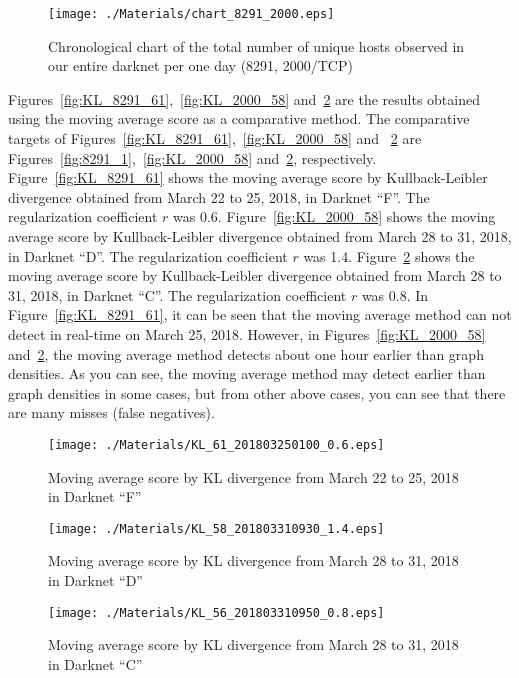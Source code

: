 \documentclass[letterpaper]{sig-alternate-10pt}
\begin{document}
\begin{figure}[htb]
\begin{center}
	\texttt{[image: ./Materials/chart\_8291\_2000.eps]}
	\caption{Chronological chart of the total number of unique hosts observed in our entire darknet per one day (8291, 2000/TCP)}
  	\label{fig:chart_8291_2000}
\end{center}
\end{figure}

Figures~\ref{fig:KL_8291_61},~\ref{fig:KL_2000_58} and~\ref{fig:KL_2000_56} are the results obtained using the moving average score as a comparative method.
The comparative targets of Figures~\ref{fig:KL_8291_61},~\ref{fig:KL_2000_58} and ~\ref{fig:KL_2000_56} are Figures~\ref{fig:8291_1},~\ref{fig:KL_2000_58} and~\ref{fig:KL_2000_56}, respectively.
Figure~\ref{fig:KL_8291_61} shows the moving average score by Kullback-Leibler divergence obtained from March 22 to 25, 2018, in Darknet ``F''.
The regularization coefficient $r$ was 0.6.
Figure~\ref{fig:KL_2000_58} shows the moving average score by Kullback-Leibler divergence obtained from March 28 to 31, 2018, in Darknet ``D''.
The regularization coefficient $r$ was 1.4.
Figure~\ref{fig:KL_2000_56} shows the moving average score by Kullback-Leibler divergence obtained from March 28 to 31, 2018, in Darknet ``C''.
The regularization coefficient $r$ was 0.8.
In Figure~\ref{fig:KL_8291_61}, it can be seen that the moving average method can not detect in real-time on March 25, 2018.
However, in Figures~\ref{fig:KL_2000_58} and~\ref{fig:KL_2000_56}, the moving average method detects about one hour earlier than graph densities.
As you can see, the moving average method may detect earlier than graph densities in some cases, but from other above cases, you can see that there are many misses (false negatives).

\begin{figure}[htb]
\begin{center}
	\texttt{[image: ./Materials/KL\_61\_201803250100\_0.6.eps]}
	\caption{Moving average score by KL divergence from March 22 to 25, 2018 in Darknet ``F''}
  	\label{fig:KL_8291_61}
	\vspace*{0.5cm}
	\texttt{[image: ./Materials/KL\_58\_201803310930\_1.4.eps]}
	\caption{Moving average score by KL divergence from March 28 to 31, 2018 in Darknet ``D''}
  	\label{fig:KL_2000_58}
	\texttt{[image: ./Materials/KL\_56\_201803310950\_0.8.eps]}
	\caption{Moving average score by KL divergence from March 28 to 31, 2018 in Darknet ``C''}
  	\label{fig:KL_2000_56}
\end{center}
\end{figure}
\end{document}
